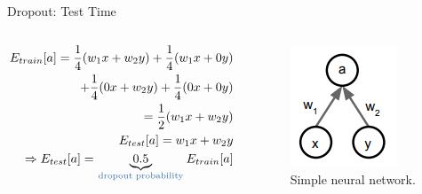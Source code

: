 \begin{frame}{Dropout: Test Time}
	\begin{columns}
		\begin{column}{0.5\textwidth}
			\begin{align*}
				E_{train}[a] = \frac{1}{4}(w_1 x + w_2 y)
				+ \frac{1}{4}(w_1 x + 0 y) \\
				+ \frac{1}{4}(0 x + w_2 y) + \frac{1}{4}(0 x + 0 y) \\
				= \frac{1}{2}(w_1 x + w_2 y) \\
				E_{test}[a] = w_1 x + w_2 y \\
				\Rightarrow E_{test}[a] = \underbrace{0.5}_{\text{\tc{keywords}{dropout probability}}} E_{train}[a]
			\end{align*}
		\end{column}
		\begin{column}{0.5\textwidth}
			\begin{figure}[H]
				\centering
				\includegraphics[height=0.4\textheight]{Figs/section_4/dropout_test.png}
				\caption{Simple neural network. \cite{cs231n-2018-lecture7}}
			\end{figure}
		\end{column}
	\end{columns}
\end{frame}


